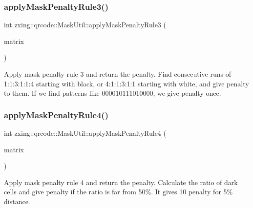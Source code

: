 \subsubsection{\texorpdfstring{apply\+Mask\+Penalty\+Rule3()}{applyMaskPenaltyRule3()}}
{\footnotesize\ttfamily int zxing\+::qrcode\+::\+Mask\+Util\+::apply\+Mask\+Penalty\+Rule3 (\begin{DoxyParamCaption}\item[{const \mbox{\hyperlink{classzxing_1_1qrcode_1_1_byte_matrix}{Byte\+Matrix}} \&}]{matrix }\end{DoxyParamCaption})\hspace{0.3cm}{\ttfamily [static]}}

Apply mask penalty rule 3 and return the penalty. Find consecutive runs of 1\+:1\+:3\+:1\+:1\+:4 starting with black, or 4\+:1\+:1\+:3\+:1\+:1 starting with white, and give penalty to them. If we find patterns like 000010111010000, we give penalty once. \mbox{\label{classzxing_1_1qrcode_1_1_mask_util_a2224bed0a422e85b78c508983ae9db4c}} 
\subsubsection{\texorpdfstring{apply\+Mask\+Penalty\+Rule4()}{applyMaskPenaltyRule4()}}
{\footnotesize\ttfamily int zxing\+::qrcode\+::\+Mask\+Util\+::apply\+Mask\+Penalty\+Rule4 (\begin{DoxyParamCaption}\item[{const \mbox{\hyperlink{classzxing_1_1qrcode_1_1_byte_matrix}{Byte\+Matrix}} \&}]{matrix }\end{DoxyParamCaption})\hspace{0.3cm}{\ttfamily [static]}}

Apply mask penalty rule 4 and return the penalty. Calculate the ratio of dark cells and give penalty if the ratio is far from 50\%. It gives 10 penalty for 5\% distance. \mbox{\label{classzxing_1_1qrcode_1_1_mask_util_ab094f1548f9bbb715c7227893da58009}} 
